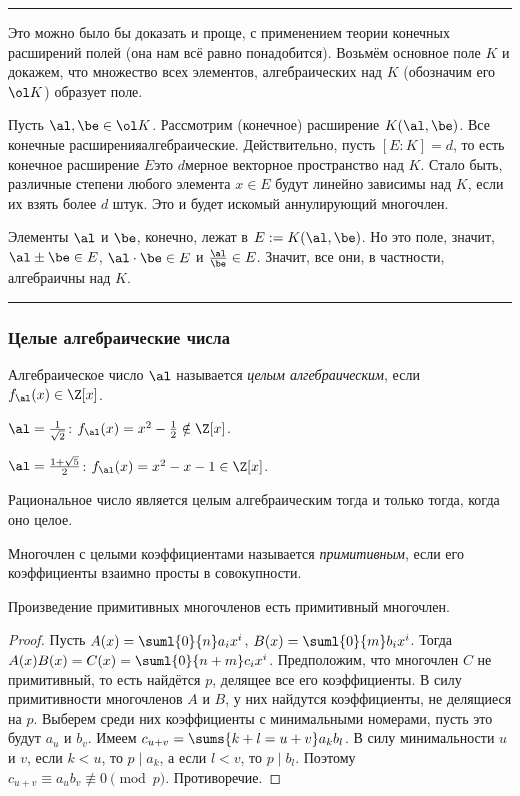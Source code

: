 \documentclass[a4paper]{article}
\def\nequiv{\not\equiv}
\newenvironment{petit}
{\par\smallskip\hrule\smallskip\footnotesize}{\par\smallskip\hrule\smallskip}
\begin{document}
\begin{petit}
Это можно было бы доказать и проще, с применением теории конечных расширений полей (она нам всё равно понадобится).
Возьмём основное поле $K$ и докажем, что множество всех элементов, алгебраических над $K$ (обозначим его $\ol K$)
образует поле.

Пусть $\al, \be \in \ol K$. Рассмотрим (конечное) расширение $K(\al, \be)$. Все конечные расширения\т алгебраические.
Действительно, пусть $[E:K] =d$, то есть конечное расширение $E$\т это $d$\д мерное векторное пространство над $K$.
Стало быть, различные степени любого элемента $x \in E$ будут линейно зависимы над $K$, если их взять более $d$ штук.
Это и будет искомый аннулирующий многочлен.

Элементы $\al$ и $\be$, конечно, лежат в $E:=K(\al,\be)$. Но это поле, значит, $\al\pm \be \in E$, $\al\cdot \be \in E$
и $\frac{\al}{\be} \in E$. Значит, все они, в частности, алгебраичны над $K$.
\end{petit}


\subsubsection{Целые алгебраические числа}

\begin{df}
Алгебраическое число $\al$ называется \emph{целым алгебраическим}, если $f_{\al}(x)\in\Z[x]$.
\end{df}

\begin{ex}
$\al=\frac1{\sqrt{2}}$: $f_{\al}(x)=x^2-\frac12\notin\Z[x]$.
\end{ex}

\begin{ex}
$\al=\frac{1+\sqrt{5}}2$: $f_{\al}(x)=x^2-x-1\in\Z[x]$.
\end{ex}

\begin{ex}
Рациональное число является целым алгебраическим тогда и только тогда, когда оно целое.
\end{ex}

\begin{df}
Многочлен с целыми коэффициентами называется \emph{примитивным}, если его коэффициенты взаимно просты в совокупности.
\end{df}

\begin{lemma}[Гаусс]
Произведение примитивных многочленов есть примитивный многочлен.
\end{lemma}
\begin{proof}
Пусть $A(x)=\suml{0}{n}a_ix^i$, $B(x)=\suml{0}{m}b_ix^i$. Тогда $A(x)B(x)=C(x)=\suml{0}{n+m}c_ix^i$. Предположим, что
многочлен $C$ не примитивный, то есть найдётся $p$, делящее все его коэффициенты.
В силу примитивности многочленов $A$ и $B$, у них найдутся коэффициенты, не делящиеся на $p$.
Выберем среди них коэффициенты с минимальными номерами, пусть это будут $a_u$ и $b_v$.
Имеем $c_{u+v}=\sums{k+l=u+v}a_kb_l$. В силу минимальности $u$ и $v$, если $k<u$, то $p\mid a_k$, а если
$l<v$, то $p\mid b_l$. Поэтому $c_{u+v}\equiv a_ub_v\nequiv0\pmod{p}$. Противоречие.
\end{proof}
\end{document}
